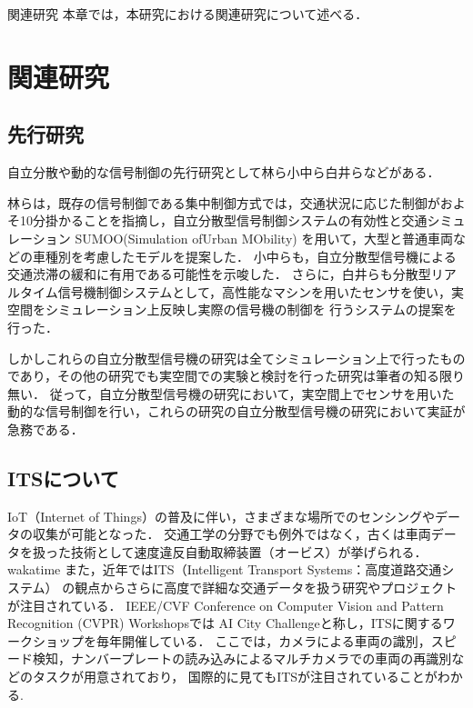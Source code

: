 \chapterhead
{関連研究}
{本章では，本研究における関連研究について述べる．}

\section{関連研究}

\subsection{先行研究}
自立分散や動的な信号制御の先行研究として林ら\cite{hayashi}小中ら\cite{konaka}白井ら\cite{shirai}などがある．

林らは，既存の信号制御である集中制御方式では，交通状況に応じた制御がおよそ10分掛かることを指摘し，自立分散型信号制御システムの有効性と交通シミュレーション
SUMOO(Simulation ofUrban MObility) を用いて，大型と普通車両などの車種別を考慮したモデルを提案した．
小中らも，自立分散型信号機による交通渋滞の緩和に有用である可能性を示唆した．
さらに，白井らも分散型リアルタイム信号機制御システムとして，高性能なマシンを用いたセンサを使い，実空間をシミュレーション上反映し実際の信号機の制御を
行うシステムの提案を行った．

しかしこれらの自立分散型信号機の研究は全てシミュレーション上で行ったものであり，その他の研究でも実空間での実験と検討を行った研究は筆者の知る限り無い．
従って，自立分散型信号機の研究において，実空間上でセンサを用いた動的な信号制御を行い，これらの研究の自立分散型信号機の研究において実証が急務である．

\subsection{ITSについて}
IoT（Internet of Things）の普及に伴い，さまざまな場所でのセンシングやデータの収集が可能となった．
交通工学の分野でも例外ではなく，古くは車両データを扱った技術として速度違反自動取締装置（オービス）が挙げられる．wakatime
また，近年ではITS（Intelligent Transport Systems：高度道路交通システム）
の観点からさらに高度で詳細な交通データを扱う研究やプロジェクトが注目されている．
IEEE/CVF Conference on Computer Vision and Pattern Recognition (CVPR) Workshopsでは
AI City Challenge\cite{Naphade_2020_CVPR_Workshops}と称し，ITSに関するワークショップを毎年開催している．
ここでは，カメラによる車両の識別，スピード検知，ナンバープレートの読み込みによるマルチカメラでの車両の再識別などのタスクが用意されており，
国際的に見てもITSが注目されていることがわかる.

